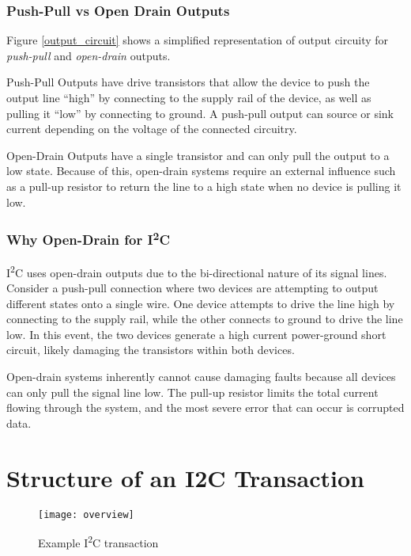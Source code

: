\documentclass[11pt,fleqn]{book} %
\begin{document}
        \subsubsection{Push-Pull vs Open Drain Outputs}
        Figure \ref{output_circuit} shows a simplified representation of output circuity for \textit{push-pull} and \textit{open-drain} outputs. 
        
        Push-Pull Outputs have drive transistors that allow the device to push the output line ``high'' by connecting to the supply rail of the device, as well as pulling it ``low'' by connecting to ground. A push-pull output can source or sink current depending on the voltage of the connected circuitry. 
        
        Open-Drain Outputs have a single transistor and can only pull the output to a low state. Because of this, open-drain systems require an external influence such as a pull-up resistor to return the line to a high state when no device is pulling it low. 
        
        \subsubsection{Why Open-Drain for I\textsuperscript{2}C}
            I\textsuperscript{2}C uses open-drain outputs due to the bi-directional nature of its signal lines. Consider a push-pull connection where two devices are attempting to output different states onto a single wire. One device attempts to drive the line high by connecting to the supply rail, while the other connects to ground to drive the line low. In this event, the two devices generate a high current power-ground short circuit, likely damaging the transistors within both devices. 
            
            Open-drain systems inherently cannot cause damaging faults because all devices can only pull the signal line low. The pull-up resistor limits the total current flowing through the system, and the most severe error that can occur is corrupted data. 

\section{Structure of an I2C Transaction}	
    
    \begin{figure}[]
        \centering\texttt{[image: overview]}
        \caption{Example I\textsuperscript{2}C transaction}
        \label{overview}
    \end{figure}
    
\end{document}
